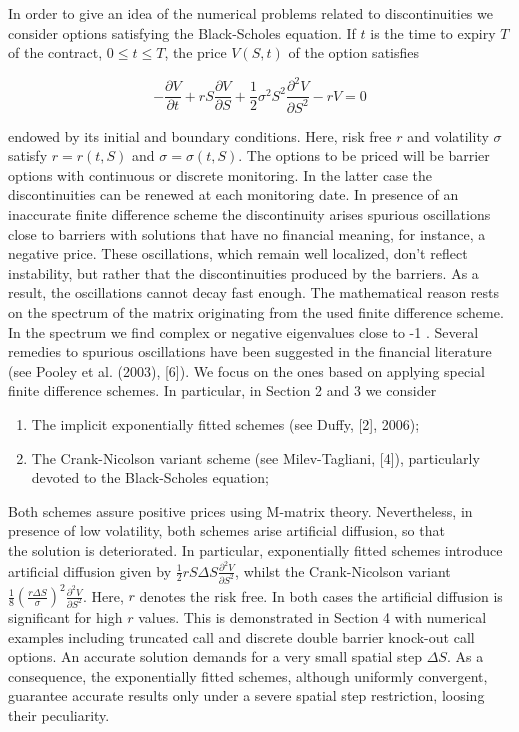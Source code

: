 \documentclass[10pt]{article}
\begin{document}
In order to give an idea of the numerical problems related to discontinuities we consider options satisfying the Black-Scholes equation. If $t$ is the time to expiry $T$ of the contract, $0 \leq t \leq T$, the price $V(S, t)$ of the option satisfies


\begin{equation*}
-\frac{\partial V}{\partial t}+r S \frac{\partial V}{\partial S}+\frac{1}{2} \sigma^{2} S^{2} \frac{\partial^{2} V}{\partial S^{2}}-r V=0 \tag{1}
\end{equation*}


endowed by its initial and boundary conditions. Here, risk free $r$ and volatility $\sigma$ satisfy $r=r(t, S)$ and $\sigma=\sigma(t, S)$. The options to be priced will be barrier options with continuous or discrete monitoring. In the latter case the discontinuities can be renewed at each monitoring date. In presence of an inaccurate finite difference scheme the discontinuity arises spurious oscillations close to barriers with solutions that have no financial meaning, for instance, a negative price. These oscillations, which remain well localized, don't reflect instability, but rather that the discontinuities produced by the barriers. As a result, the oscillations cannot decay fast enough. The mathematical reason rests on the spectrum of the matrix originating from the used finite difference scheme. In the spectrum we find complex or negative eigenvalues close to -1 . Several remedies to spurious oscillations have been suggested in the financial literature (see Pooley et al. (2003), [6]). We focus on the ones based on applying special finite difference schemes. In particular, in Section 2 and 3 we consider

\begin{enumerate}
  \item The implicit exponentially fitted schemes (see Duffy, [2], 2006);
  \item The Crank-Nicolson variant scheme (see Milev-Tagliani, [4]), particularly devoted to the Black-Scholes equation;
\end{enumerate}

Both schemes assure positive prices using M-matrix theory. Nevertheless, in presence of low volatility, both schemes arise artificial diffusion, so that\\
the solution is deteriorated. In particular, exponentially fitted schemes introduce artificial diffusion given by $\frac{1}{2} r S \Delta S \frac{\partial^{2} V}{\partial S^{2}}$, whilst the Crank-Nicolson variant $\frac{1}{8}\left(\frac{r \Delta S}{\sigma}\right)^{2} \frac{\partial^{2} V}{\partial S^{2}}$. Here, $r$ denotes the risk free. In both cases the artificial diffusion is significant for high $r$ values. This is demonstrated in Section 4 with numerical examples including truncated call and discrete double barrier knock-out call options. An accurate solution demands for a very small spatial step $\Delta S$. As a consequence, the exponentially fitted schemes, although uniformly convergent, guarantee accurate results only under a severe spatial step restriction, loosing their peculiarity.
\end{document}
